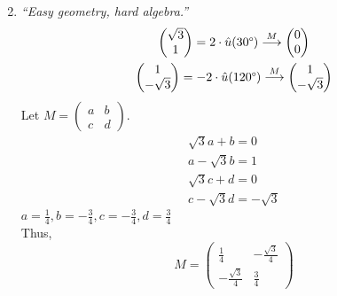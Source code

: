\documentclass[12pt]{article}
\begin{document}
\begin{enumerate}[label=(\alph*)]
\begin{equation*}
{		}
	\end{equation*}
	\item \textit{``Easy geometry, hard algebra.''}
	\begin{gather*}
		\begin{pmatrix} \sqrt{3} \\ 1 \end{pmatrix}
		=
		2 \cdot \hat u(30 \degree)
		\overset{M}{\longrightarrow}
		\begin{pmatrix} 0 \\ 0 \end{pmatrix}
		\\
		\begin{pmatrix} 1 \\ -\sqrt{3} \end{pmatrix}
		=
		-2 \cdot \hat u(120 \degree)
		\overset{M}{\longrightarrow}
		\begin{pmatrix} 1 \\ -\sqrt{3} \end{pmatrix}
	\end{gather*}
	Let $M = \begin{pmatrix} a & b \\ c & d \end{pmatrix}$.
	\begin{gather*}
		\sqrt{3}a + b = 0 \\
		a - \sqrt{3}b = 1 \\
		\sqrt{3}c + d = 0 \\
		c - \sqrt{3}d = -\sqrt{3}
	\end{gather*}
	$a = \frac{1}{4}, b = -\frac{3}{4}, c = -\frac{3}{4}, d = \frac{3}{4}$
	\\[\baselineskip]
	Thus,
	\begin{equation*}
		M =
		\boxed{
			\begin{pmatrix}
				\frac{1}{4} & -\frac{\sqrt{3}}{4} \\
				-\frac{\sqrt{3}}{4} & \frac{3}{4}
			\end{pmatrix}
		}
	\end{equation*}
\end{enumerate}
\end{document}
